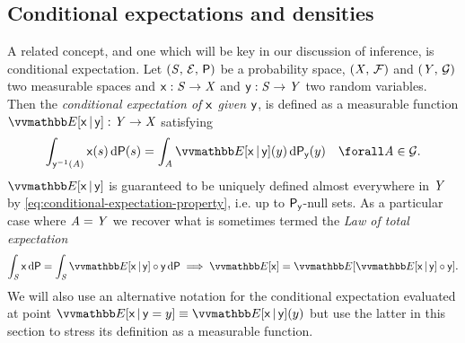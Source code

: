 \subsection{Conditional expectations and densities}

A related concept, and one which will be key in our discussion of inference, is conditional expectation. Let $(\mathit{S},\,\mathcal{E},\,\mathsf{P})$ be a probability space, $(\mathit{X},\,\mathcal{F})$ and $(\mathit{Y},\,\mathcal{G})$ two measurable spaces and $\mathsf{x} : \mathit{S} \to \mathit{X}$ and $\mathsf{y} : \mathit{S} \to \mathit{Y}$ two random variables. Then the \emph{conditional expectation of $\mathsf{x}$ given $\mathsf{y}$}, is defined as a measurable function $\expc{\rvar{x}\gvn\rvar{y}} : \set{Y} \to \set{X}$ satisfying
\begin{equation}\label{eq:conditional-expectation-property}
  \int_{\rvar{y}^{-1}(\set{A})} \rvar{x}(s) \,\dr\probability(s) =
  \int_{\set{A}} \expc{\rvar{x}\gvn\rvar{y}}(y) \,\dr\prob{\rvar{y}}(y)
  \quad \forall \set{A} \in \sset{G}.
\end{equation}
$\expc{\rvar{x}\gvn\rvar{y}}$ is guaranteed to be uniquely defined almost everywhere in $\mathit{Y}$ by \eqref{eq:conditional-expectation-property}, i.e. up to $\mathsf{P}_{\mathsf{y}}$-null sets. As a particular case where $\mathit{A} = \mathit{Y}$ we recover what is sometimes termed the \emph{Law of total expectation}
\begin{equation}\label{eq:law-of-total-expectation}
  \int_{\set{S}} \rvar{x} \,\dr\probability =
  \int_{\set{S}} \expc{\rvar{x}\gvn\rvar{y}} \circ \rvar{y} \,\dr\probability
   \implies
  \expc{\rvar{x}} =
  \expc{\expc{\rvar{x}\gvn\rvar{y}}\circ\rvar{y}}.
\end{equation}
We will also use an alternative notation for the conditional expectation evaluated at point $\expc{\rvar{x}\gvn\rvar{y} = y} \equiv \expc{\rvar{x}\gvn\rvar{y}}(y)$ but use the latter in this section to stress its definition as a measurable function.


